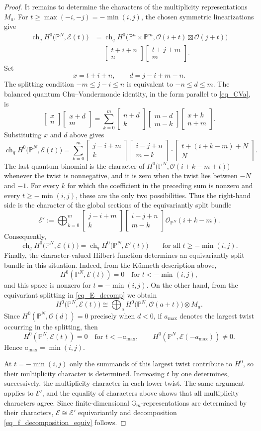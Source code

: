 \documentclass{article}
\newcommand{\mcO}{\mathcal{O}}
\newcommand{\PP}{\mathbb{P}}
\DeclareMathOperator{\ch}{ch}
\newcommand{\bbinom}[2]{
  \begin{bmatrix}
    #1 \\
    #2
  \end{bmatrix}
}
\theoremstyle{definition}
\theoremstyle{definition}
\begin{document}
\begin{proof}
It remains to determine the characters of the multiplicity representations $M_a$.  For
$t\ge\max(-i,-j)=-\min(i,j)$, the chosen symmetric linearizations give
\begin{align*}
\ch_q H^0\bigl(\PP^N,\mathcal E(t)\bigr)
&=\ch_q H^0\bigl(\PP^n\times\PP^m,
\mcO(i+t)\boxtimes\mcO(j+t)\bigr)\\
&=\bbinom{t+i+n}{n}\bbinom{t+j+m}{m}.
\end{align*}
Set
\[
x=t+i+n,\qquad d=j-i+m-n.
\]
The splitting condition $-m\le j-i\le n$ is equivalent to $-n\le d\le m$.  The balanced quantum Chu--Vandermonde identity, in the form parallel to \eqref{eq_CVa}, is
\[
\bbinom{x}{n}\bbinom{x+d}{m}
=
\sum_{k=0}^{m}
\bbinom{n+d}{k}
\bbinom{m-d}{m-k}
\bbinom{x+k}{n+m}.
\]
Substituting  $x$ and $d$ above gives
\begin{equation}
\ch_q H^0\bigl(\PP^N,\mathcal E(t)\bigr)
=
\sum_{k=0}^{m}
\bbinom{j-i+m}{k}
\bbinom{i-j+n}{m-k}
\cdot
\bbinom{t+(i+k-m)+N}{N}.
\end{equation}
The last quantum binomial is the character of
$H^0\bigl(\PP^N,\mcO(i+k-m+t)\bigr)$ whenever the twist is nonnegative, and it is zero when the twist lies between $-N$ and $-1$.  For every $k$ for which the coefficient in the preceding sum is nonzero and every $t\ge -\min(i,j)$, these are the only two possibilities.  Thus the right-hand side is the character of the global sections of the equivariantly split bundle
\[
\mathcal E'
:=
\bigoplus_{k=0}^{m}
\bbinom{j-i+m}{k}
\bbinom{i-j+n}{m-k}
\mcO_{\PP^N}(i+k-m).
\]
Consequently,
\[
\ch_q H^0\bigl(\PP^N,\mathcal E(t)\bigr)
=
\ch_q H^0\bigl(\PP^N,\mathcal E'(t)\bigr)
\qquad
\text{for all }t\ge - \min(i,j).
\]
Finally, the character-valued Hilbert function determines an equivariantly split bundle in this situation.  Indeed, from the K\"unneth description above,
\[
H^0(\PP^N,\mathcal E(t))=0
\quad\text{for }t<-\min(i,j),
\]
and this space is nonzero for $t=-\min(i,j)$.  On the other hand, from the equivariant splitting in \eqref{eq_E_decomp}
we obtain
\[
H^0\bigl(\PP^N,\mathcal E(t)\bigr)
\cong
\bigoplus_a
H^0\bigl(\PP^N,\mcO(a+t)\bigr)\otimes M_a.
\]
Since $H^0(\PP^N,\mcO(d))=0$ precisely when $d<0$, if $a_{\max}$ denotes the largest twist occurring in the splitting, then
\[
H^0(\PP^N,\mathcal E(t))=0
\quad\text{for }t<-a_{\max},
\qquad
H^0(\PP^N,\mathcal E(-a_{\max}))\ne 0.
\]
Hence $a_{\max}=\min(i,j)$.

At $t=-\min(i,j)$ only the summands of this largest twist contribute to $H^0$, so their multiplicity character is determined.  Increasing $t$ by one determines, successively, the multiplicity character in each lower twist.  The same argument applies to $\mathcal E'$, and the equality of characters above shows that all multiplicity characters agree.  Since finite-dimensional $\mathbb G_m$-representations are determined by their characters, $\mathcal E\cong\mathcal E'$ equivariantly and decomposition \eqref{eq_f_decomposition_equiv} follows.
\end{proof}
\end{document}
